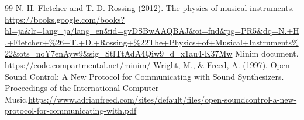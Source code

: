 \documentclass[uplatex,dvipdfmx]{jsarticle}
\begin{document}
\begin{thebibliography}{99}
         N. H. Fletcher and T. D. Rossing (2012). The physics of musical instruments. \url{https://books.google.com/books?hl=ja&lr=lang_ja/lang_en&id=gvDSBwAAQBAJ&oi=fnd&pg=PR5&dq=N.+H.+Fletcher+%26+T.+D.+Rossing+%22The+Physics+of+Musical+Instruments%22&ots=noY7enAyw9&sig=StlTtAdA4Qiw9_d_x1au4-K37Mw}
         Minim document. \url{https://code.compartmental.net/minim/}
         Wright, M., \& Freed, A. (1997). Open Sound Control: A New Protocol for Communicating with Sound Synthesizers. Proceedings of the International Computer Music.\url{https://www.adrianfreed.com/sites/default/files/open-soundcontrol-a-new-protocol-for-communicating-with.pdf}
\end{thebibliography}
\end{document}
